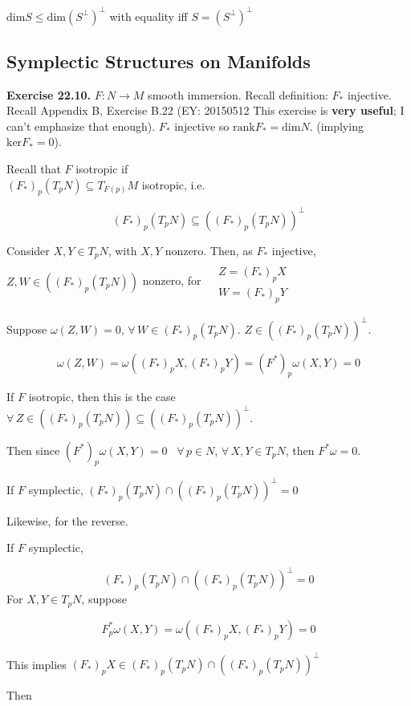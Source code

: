 \documentclass[11pt]{amsart}
\theoremstyle{definition}
\newcommand{\exercisehead}[1]{\medskip\noindent\textbf{Exercise #1.} }
\begin{document}
$\text{dim}S \leq \text{dim} (S^{\perp})^{\perp}$ with equality iff $S= (S^{\perp})^{\perp}$




\subsection{Symplectic Structures on Manifolds}

\exercisehead{22.10} $F:N\to M$ smooth immersion.  Recall definition: $F_*$ injective.  Recall Appendix B, Exercise B.22 (EY: 20150512 This exercise is \textbf{very useful}; I can't emphasize that enough).  $F_*$ injective so $\text{rank}F_* = \text{dim}N$. (implying $\text{ker}F_*=0$).

Recall that $F$ isotropic if \\

$(F_*)_p(T_pN) \subseteq T_{F(p)}M$ isotropic, i.e.

\[
(F_*)_p(T_pN) \subseteq ((F_*)_p(T_pN))^{\perp}
\]

Consider $X,Y \in T_pN$, with $X,Y$ nonzero.  Then, as $F_*$ injective, $Z,W \in ((F_*)_p(T_pN))$ nonzero, for $\begin{aligned}
& \quad \\
  & Z = (F_*)_pX \\
  & W = (F_*)_pY \end{aligned}$

Suppose $\omega(Z,W)=0$, $\forall \, W \in (F_*)_p(T_pN)$.  $Z \in ((F_*)_p(T_pN))^{\perp}$.

\[
\omega(Z,W) = \omega((F_*)_pX, (F_*)_pY) = (F^*)_p\omega(X,Y)=0
\]

If $F$ isotropic, then this is the case $\forall \, Z \in ((F_*)_p(T_pN)) \subseteq ((F_*)_p(T_pN))^{\perp}$.

Then since $(F^*)_p\omega(X,Y)=0$ \, $\forall \, p \in N$, $\forall \, X,Y \in T_pN$, then $F^*\omega=0$.

If $F$ symplectic, $(F_*)_p(T_pN) \cap ((F_*)_p(T_pN))^{\perp}=0$

Likewise, for the reverse.

If $F$ symplectic,

\[
(F_*)_p(T_pN) \cap ((F_*)_p(T_pN))^{\perp}=0
\]
For $ X,Y \in T_pN$, suppose

\[
F_p^*\omega(X,Y) = \omega((F_*)_pX, (F_*)_pY) =0
\]

This implies $(F_*)_pX \in (F_*)_p(T_pN) \cap ((F_*)_p(T_pN))^{\perp}$

Then
\end{document}
